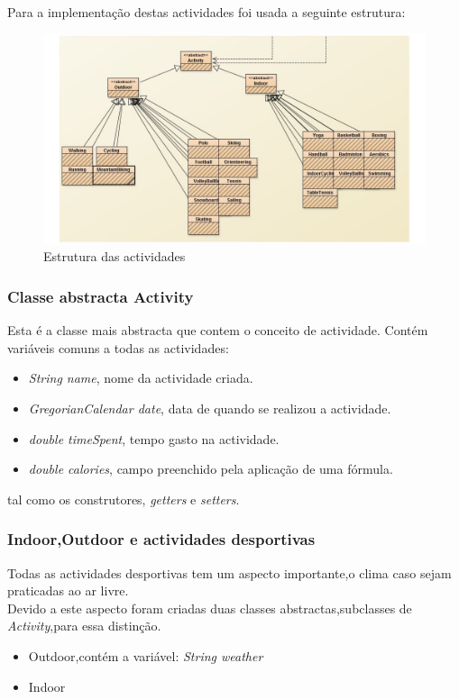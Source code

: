 \documentclass[12pt,notitlepage]{article}
\begin{document}
Para a implementação destas actividades foi usada a seguinte estrutura:



\begin{figure}[ht]
\centering
\includegraphics[scale=0.5]{Activity2.jpg}
\caption{Estrutura das actividades}
\label{fig:actividades}
\end{figure}


\subsubsection{Classe abstracta Activity}

Esta é a classe mais abstracta que contem o conceito de actividade. Contém variáveis comuns a todas as actividades:
\begin{itemize}
\item \textit{String name}, nome da actividade criada.
\item \textit{GregorianCalendar date}, data de quando se realizou a actividade.
\item \textit{double timeSpent}, tempo gasto na actividade.
\item \textit{double calories}, campo preenchido pela aplicação de uma fórmula.
\end{itemize}
tal como os construtores, \textit{getters} e \textit{setters}.


\subsubsection{Indoor,Outdoor e actividades desportivas}
Todas as actividades desportivas tem um aspecto importante,o clima caso sejam praticadas ao ar livre.\\
Devido a este aspecto foram criadas duas classes abstractas,subclasses de \textit{Activity},para essa distinção.
\begin{itemize}
\item Outdoor,contém a variável: \textit{String weather}
\item Indoor
\end{itemize}
\end{document}

